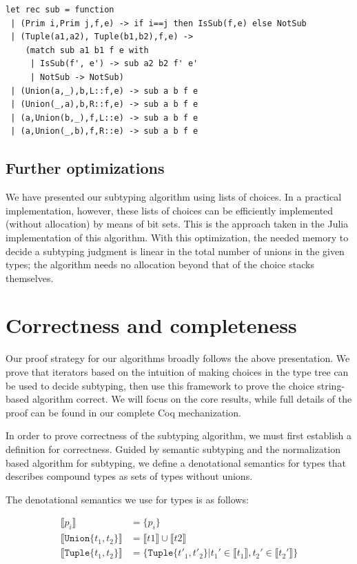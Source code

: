 \documentclass[a4paper,english]{lipics-v2019}
\newcommand{\xt}[1]{\texttt{#1}}
\newcommand{\tuplet}[2]{\xt{Tuple\{}#1,#2\xt{\}}}
\newcommand{\union}[2]{\xt{Union\{}#1,#2\xt{\}}}
\newcommand{\denotes}[1]{\llbracket #1 \rrbracket}
\begin{document}
\begin{lstlisting}
let rec sub = function
 | (Prim i,Prim j,f,e) -> if i==j then IsSub(f,e) else NotSub
 | (Tuple(a1,a2), Tuple(b1,b2),f,e) ->
    (match sub a1 b1 f e with
     | IsSub(f', e') -> sub a2 b2 f' e'
     | NotSub -> NotSub)
 | (Union(a,_),b,L::f,e) -> sub a b f e
 | (Union(_,a),b,R::f,e) -> sub a b f e
 | (a,Union(b,_),f,L::e) -> sub a b f e
 | (a,Union(_,b),f,R::e) -> sub a b f e
\end{lstlisting}

\subsection{Further optimizations}

We have presented our subtyping algorithm using lists of choices. In a
practical implementation, however, these lists of choices can be efficiently
implemented (without allocation) by means of bit sets. This is the approach
taken in the Julia implementation of this algorithm. With this optimization,
the needed memory to decide a subtyping judgment is linear in the total number
of unions in the given types; the algorithm needs no allocation beyond that
of the choice stacks themselves.

\section{Correctness and completeness}

Our proof strategy for our algorithms broadly follows the above presentation.
We prove that iterators based on the intuition of making choices in the type
tree can be used to decide subtyping, then use this framework to prove the
choice string-based algorithm correct. We will focus on the core results,
while full details of the proof can be found in our complete Coq
mechanization.

In order to prove correctness of the subtyping algorithm, we must first establish
a definition for correctness. Guided by semantic subtyping and the normalization based
algorithm for subtyping, we define a denotational semantics for types that describes
compound types as sets of types without unions.

The denotational semantics we use for types is as follows:

\begin{align*}
\denotes{p_i} &= \{p_i\} \\
\denotes{\union{t_1}{t_2}} &= \denotes{t1} \cup \denotes{t2} \\
\denotes{\tuplet{t_1}{t_2}} &= \{\tuplet{t'_1}{t'_2} | t_1' \in \denotes{t_1},  t_2' \in \denotes{t_2'}\} \\
\end{align*}
\end{document}
